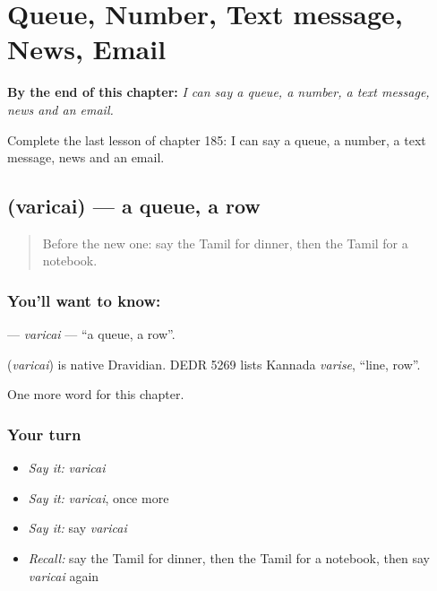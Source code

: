 
\chapter{Queue, Number, Text message, News, Email}
\label{ch:ta-queue-number-text-message-news-email}

\begin{chapteropening}
\textbf{By the end of this chapter:} \emph{I can say a queue, a number, a text message, news and an email.}

Complete the last lesson of chapter 185: I can say a queue, a number, a text message, news and an email.
\end{chapteropening}

\section[\texorpdfstring{\ta{வரிசை} (varicai)}{வரிசை (varicai)}]{ (varicai) — a queue, a row}

\label{lesson:TA-C185-varicai}



\begin{quote}
Before the new one: say the Tamil for dinner, then the Tamil for a notebook.
\end{quote}

\subsection*{You'll want to know: }
\textbf{} — \emph{varicai} — \textquotedblleft{}a queue, a row\textquotedblright{}.

\begin{cousinweb}
\textbf{} (\emph{varicai}) is native Dravidian. DEDR 5269 lists Kannada \emph{varise}, \textquotedblleft{}line, row\textquotedblright{}.
\end{cousinweb}

\begin{grammarlens}[title={What you've built}]
One more word for this chapter.
\end{grammarlens}

\subsection*{Your turn}
\begin{itemize}
\raggedright
  \item \emph{Say it:} \emph{varicai}
  \item \emph{Say it:} \emph{varicai}, once more
  \item \emph{Say it:} say \emph{varicai}
  \item \emph{Recall:} say the Tamil for dinner, then the Tamil for a notebook, then say \emph{varicai} again
\end{itemize}

